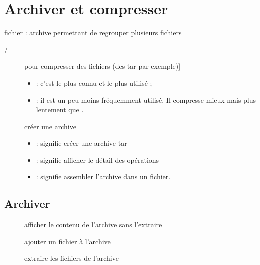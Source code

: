 \documentclass[letterpaper,10pt,french]{sphinxmanual}
\begin{document}
\chapter{Archiver et compresser}
\label{\detokenize{15-archiver:archiver-et-compresser}}\label{\detokenize{15-archiver::doc}}
fichier  : archive permettant de regrouper plusieurs fichiers
\begin{description}
\item[{/}] \leavevmode{[}pour compresser des fichiers (des tar par exemple){]}\begin{itemize}
\item {} 
 : c’est le plus connu et le plus utilisé ;

\item {} 
 : il est un peu moins fréquemment utilisé. Il compresse mieux mais plus lentement que .

\end{itemize}

\item[{}] \leavevmode
créer une archive
\begin{itemize}
\item {} 
 : signifie créer une archive tar

\item {} 
 : signifie afficher le détail des opérations

\item {} 
 : signifie assembler l’archive dans un fichier.

\end{itemize}

\end{description}


\section{Archiver}
\label{\detokenize{15-archiver:archiver}}\begin{description}
\item[{}] \leavevmode
afficher le contenu de l’archive sans l’extraire

\item[{}] \leavevmode
ajouter un fichier à l’archive

\item[{}] \leavevmode
extraire les fichiers de l’archive

\end{description}
\end{document}
